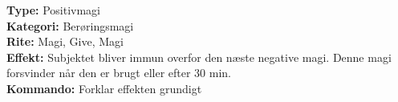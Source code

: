 \begin{lærmagi*}
\textbf{Type:} Positivmagi\\
\textbf{Kategori:} Berøringsmagi\\
\textbf{Rite:} Magi, Give, Magi\\
\textbf{Effekt:} Subjektet bliver immun overfor den næste negative magi. Denne magi forsvinder når den er brugt eller efter 30 min.\\
\textbf{Kommando:} Forklar effekten grundigt\\
\end{lærmagi*}


